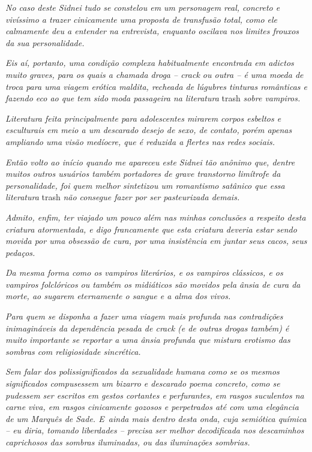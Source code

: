 \emph{No caso deste Sidnei tudo se constelou em um personagem real,
concreto e vivíssimo a trazer cinicamente uma proposta de transfusão
total, como ele calmamente deu a entender na entrevista, enquanto
oscilava nos limites frouxos da sua personalidade.}~

\emph{Eis aí, portanto, uma condição complexa habitualmente encontrada
em adictos muito graves, para os quais a chamada droga -- crack ou outra
-- é uma moeda de troca para uma viagem erótica maldita, recheada de
lúgubres tinturas românticas e fazendo eco ao que tem sido moda
passageira na literatura} trash \emph{sobre vampiros.}~

\emph{Literatura feita principalmente para adolescentes mirarem corpos
esbeltos e esculturais em meio a um descarado desejo de sexo, de
contato, porém apenas ampliando uma visão medíocre, que é reduzida a
flertes nas redes sociais.}~

\emph{Então volto ao início quando me apareceu este Sidnei tão anônimo
que, dentre muitos outros usuários também portadores de grave transtorno
limítrofe da personalidade, foi quem melhor sintetizou um romantismo
satânico que essa literatura} trash \emph{não consegue fazer por ser
pasteurizada demais.}~

\emph{Admito, enfim, ter viajado um pouco além nas minhas conclusões a
respeito desta criatura atormentada, e digo francamente que esta
criatura deveria estar sendo movida por uma obsessão de cura, por uma
insistência em juntar seus cacos, seus pedaços.}~

\emph{Da mesma forma como os vampiros literários, e os vampiros
clássicos, e os vampiros folclóricos ou também os midiáticos são movidos
pela ânsia de cura da morte, ao sugarem eternamente o sangue e a alma
dos vivos.}~

\emph{Para quem se disponha a fazer uma viagem mais profunda nas
contradições inimagináveis da dependência pesada de crack (e de outras
drogas também) é muito importante se reportar a uma ânsia profunda que
mistura erotismo das sombras com religiosidade sincrética.}~

\emph{Sem falar dos polissignificados da sexualidade humana como se os
mesmos significados compusessem um bizarro e descarado poema concreto,
como se pudessem ser escritos em gestos cortantes e perfurantes, em
rasgos suculentos na carne viva, em rasgos cinicamente gozosos e
perpetrados até com uma elegância de um Marquês de Sade. E~ainda mais
dentro desta onda, cuja semiótica química -- eu diria, tomando
liberdades -- precisa ser melhor decodificada nos descaminhos
caprichosos das sombras iluminadas, ou das iluminações sombrias.}~

